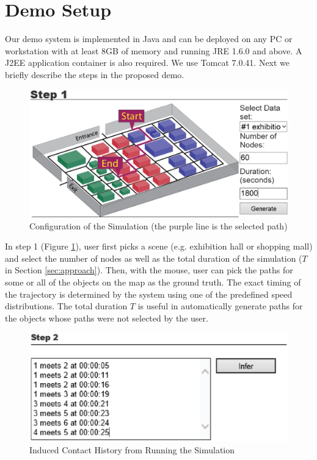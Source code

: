 \section{Demo Setup}
Our demo system is implemented in Java and can be deployed on any
PC or workstation with at least 8GB of memory and running JRE 1.6.0 and above. 
A J2EE application container is also required. We use Tomcat 7.0.41.
Next we briefly describe the steps in the proposed demo.

\begin{figure}[th]
\centering
\includegraphics[scale=0.28]{screenShot1_2.eps}
\caption{Configuration of the Simulation (the purple line is  
the selected path)}
\label{fig:screen_shot1}
\end{figure}

In step 1 (Figure \ref{fig:screen_shot1}), user first picks a scene 
(e.g. exhibition hall or shopping mall) and select the number of nodes 
as well as the total duration of the simulation ($T$ in Section 
\ref{sec:approach}). Then, with the mouse, user can pick the paths 
for some or all of the objects on the map as the ground truth. 
The exact timing of the trajectory
is determined by the system using one of the predefined speed distributions.  
The total duration $T$ is useful in automatically generate paths 
for the objects whose paths were not selected by the user.

\begin{figure}[th]
\centering
\includegraphics[scale=0.5]{screenShot2_2.eps}
\caption{Induced Contact History from Running the Simulation}
\label{fig:screen_shot2}
\end{figure}

